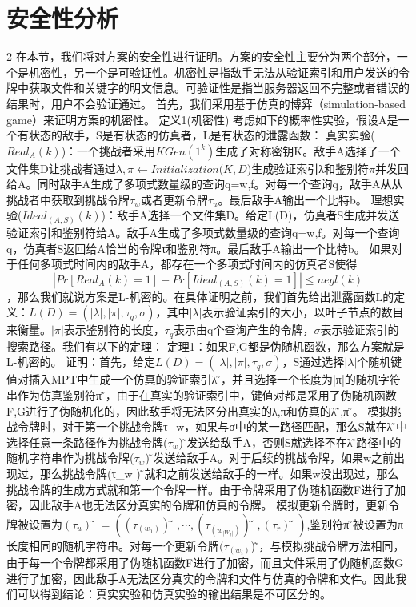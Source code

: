 \section{安全性分析} 2
在本节，我们将对方案的安全性进行证明。方案的安全性主要分为两个部分，一个是机密性，另一个是可验证性。机密性是指敌手无法从验证索引和用户发送的令牌中获取文件和关键字的明文信息。可验证性是指当服务器返回不完整或者错误的结果时，用户不会验证通过。
首先，我们采用基于仿真的博弈（simulation-based game）来证明方案的机密性。
定义1(机密性) 考虑如下的概率性实验，假设A是一个有状态的敌手，S是有状态的仿真者，L是有状态的泄露函数：
真实实验($Real_A (k)$)：一个挑战者采用$KGen(1^k)$生成了对称密钥K。敌手A选择了一个文件集D让挑战者通过${λ,π}←Initialization(K,D$)生成验证索引λ和鉴别符$π$并发回给A。同时敌手A生成了多项式数量级的查询q={w,f}。对每一个查询q，敌手A从从挑战者中获取到挑战令牌$τ_w$或者更新令牌$τ_u$。最后敌手A输出一个比特b。
理想实验($Ideal_(A,S) (k)$)：敌手A选择一个文件集D。给定L(D)，仿真者S生成并发送验证索引和鉴别符给A。敌手A生成了多项式数量级的查询q={w,f}。对每一个查询q，仿真者S返回给A恰当的令牌τ和鉴别符π。最后敌手A输出一个比特b。
如果对于任何多项式时间内的敌手A，都存在一个多项式时间内的仿真者S使得$$|Pr⁡[Real_A (k)=1]-Pr⁡[Ideal_(A,S) (k)=1] |≤negl(k)$$，那么我们就说方案是L-机密的。在具体证明之前，我们首先给出泄露函数L的定义：$L(D)=(|λ|,|π|,{τ}_q,{σ})$，其中$|λ|$表示验证索引的大小，以叶子节点的数目来衡量。$|π|$表示鉴别符的长度，${τ_q}$表示由q个查询产生的令牌，$\sigma$表示验证索引的搜索路径。我们有以下的定理：
定理1：如果F,G都是伪随机函数，那么方案就是L-机密的。
证明：首先，给定$L(D)=(|λ|,|π|,{τ}_q,{σ})$，S通过选择$|λ|$个随机键值对插入MPT中生成一个仿真的验证索引λ ̃，并且选择一个长度为|π|的随机字符串作为仿真鉴别符π ̃，由于在真实的验证索引中，键值对都是采用了伪随机函数F,G进行了伪随机化的，因此敌手将无法区分出真实的λ,π和仿真的λ ̃,π ̃。
模拟挑战令牌时，对于第一个挑战令牌τ_w，如果与{σ}中的某一路径匹配，那么S就在λ ̃中选择任意一条路径作为挑战令牌($τ_w $) ̃发送给敌手A，否则S就选择不在λ ̃路径中的随机字符串作为挑战令牌($τ_w $) ̃发送给敌手A。对于后续的挑战令牌，如果w之前出现过，那么挑战令牌(τ_w ) ̃就和之前发送给敌手的一样。如果w没出现过，那么挑战令牌的生成方式就和第一个令牌一样。由于令牌采用了伪随机函数F进行了加密，因此敌手A也无法区分真实的令牌和仿真的令牌。
模拟更新令牌时，更新令牌被设置为$(τ_u ) ̃=((τ_(w_1 ) ) ̃,⋯,(τ_(w_|W_f |  ) ) ̃,(τ_r ) ̃)$,鉴别符π ̃被设置为π长度相同的随机字符串。对每一个更新令牌$(τ_(w_i ) $) ̃，与模拟挑战令牌方法相同，由于每一个令牌都采用了伪随机函数F进行了加密，而且文件采用了伪随机函数G进行了加密，因此敌手A无法区分真实的令牌和文件与仿真的令牌和文件。因此我们可以得到结论：真实实验和仿真实验的输出结果是不可区分的。

